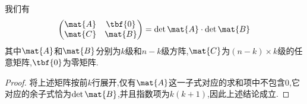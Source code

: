 \documentclass{ctexart}
\begin{document}
\begin{lemma}
    我们有
    \[\begin{pmatrix}
        \mat{A}&\tbf{0}\\
        \mat{C}&\mat{B}
    \end{pmatrix}=\det\mat{A}\cdot\det\mat{B}\]
    其中$\mat{A}$和$\mat{B}$分别为$k$级和$n-k$级方阵,$\mat{C}$为$(n-k)\times k$级的任意矩阵,$\tbf{0}$为零矩阵.
\end{lemma}
\begin{proof}
    将上述矩阵按前$k$行展开,仅有$\mat{A}$这一子式对应的求和项中不包含$0$,它对应的余子式恰为$\det\mat{B}$,并且指数项为$k(k+1)$,因此上述结论成立.
\end{proof}
\end{document}
